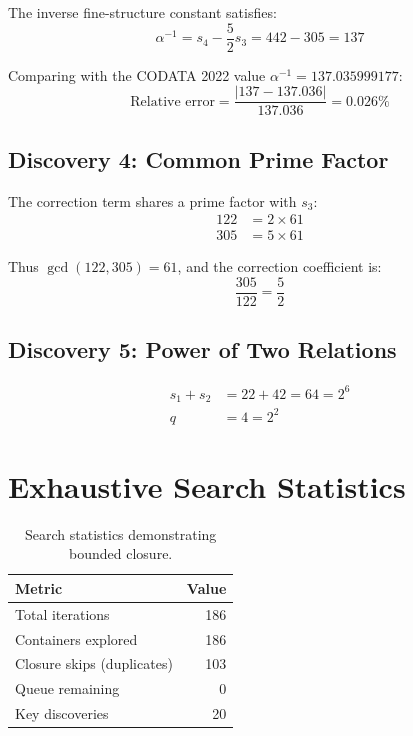\documentclass[twocolumn,prl,aps,superscriptaddress]{revtex4-2}
\begin{document}
The inverse fine-structure constant satisfies:
\begin{equation}
\boxed{\alpha^{-1} = s_4 - \frac{5}{2}s_3 = 442 - 305 = 137}
\end{equation}

Comparing with the CODATA 2022 value $\alpha^{-1} = 137.035999177$:
\begin{equation}
\text{Relative error} = \frac{|137 - 137.036|}{137.036} = 0.026\%
\end{equation}

\subsection{Discovery 4: Common Prime Factor}

The correction term shares a prime factor with $s_3$:
\begin{align}
122 &= 2 \times 61 \\
305 &= 5 \times 61
\end{align}

Thus $\gcd(122, 305) = 61$, and the correction coefficient is:
\begin{equation}
\frac{305}{122} = \frac{5}{2}
\end{equation}

\subsection{Discovery 5: Power of Two Relations}

\begin{align}
s_1 + s_2 &= 22 + 42 = 64 = 2^6 \\
q &= 4 = 2^2
\end{align}

\section{Exhaustive Search Statistics}

\begin{table}[h]
\centering
\begin{tabular}{lr}
\hline
Metric & Value \\
\hline
Total iterations & 186 \\
Containers explored & 186 \\
Closure skips (duplicates) & 103 \\
Queue remaining & 0 \\
Key discoveries & 20 \\
\hline
\end{tabular}
\caption{Search statistics demonstrating bounded closure.}
\end{table}
\end{document}
